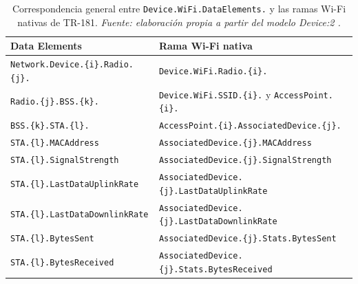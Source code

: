 \begin{table}[H]
    \centering
    \small
    \renewcommand{\arraystretch}{1.35}

    \caption[Correspondencia entre Data Elements y las ramas Wi-Fi
    nativas.]
    {Correspondencia general entre
    \texttt{Device.WiFi.DataElements.} y las ramas Wi-Fi nativas de
    TR-181. \textit{Fuente: elaboración propia a partir del modelo
    Device:2 \cite{bbf_tr181}.}}

    \label{tab:correspondencia-dataelements-wifi}

    \begin{tabular}{
        p{}
        p{}
    }
        \hline
        \textbf{Data Elements}
        &
        \textbf{Rama Wi-Fi nativa}
        \\
        \hline

        \texttt{Network.Device.\{i\}.Radio.\{j\}.}
        &
        \texttt{Device.WiFi.Radio.\{i\}.}
        \\

        \texttt{Radio.\{j\}.BSS.\{k\}.}
        &
        \texttt{Device.WiFi.SSID.\{i\}.} y
        \texttt{AccessPoint.\{i\}.}
        \\

        \texttt{BSS.\{k\}.STA.\{l\}.}
        &
        \texttt{AccessPoint.\{i\}.AssociatedDevice.\{j\}.}
        \\

        \texttt{STA.\{l\}.MACAddress}
        &
        \texttt{AssociatedDevice.\{j\}.MACAddress}
        \\

        \texttt{STA.\{l\}.SignalStrength}
        &
        \texttt{AssociatedDevice.\{j\}.SignalStrength}
        \\

        \texttt{STA.\{l\}.LastDataUplinkRate}
        &
        \texttt{AssociatedDevice.\{j\}.LastDataUplinkRate}
        \\

        \texttt{STA.\{l\}.LastDataDownlinkRate}
        &
        \texttt{AssociatedDevice.\{j\}.LastDataDownlinkRate}
        \\

        \texttt{STA.\{l\}.BytesSent}
        &
        \texttt{AssociatedDevice.\{j\}.Stats.BytesSent}
        \\

        \texttt{STA.\{l\}.BytesReceived}
        &
        \texttt{AssociatedDevice.\{j\}.Stats.BytesReceived}
        \\

        \hline
    \end{tabular}
\end{table}

